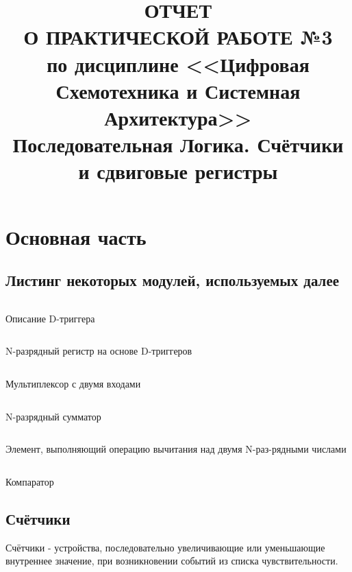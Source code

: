 \documentclass[a4paper]{article}
\title{
  ОТЧЕТ \\
  О ПРАКТИЧЕСКОЙ РАБОТЕ №3 \\
  по дисциплине <<Цифровая Схемотехника и Системная Архитектура>> \\
  Последовательная Логика. Счётчики и сдвиговые регистры
}
\begin{document}
  \templatedtitlepage
  
  \toc
  
  \section{Основная часть}

  \subsection{Листинг некоторых модулей, используемых далее}

  \begin{listing}[H]
    \inputminted{verilog}{../chapter_6/d_flip_flop.v}
    \caption{Описание D-триггера}
    \label{d_flip_flop_listing}
  \end{listing}

  \begin{listing}[H]
    \inputminted{verilog}{../chapter_6/register.v}
    \caption{N-разрядный регистр на основе D-триггеров}
    \label{register_listing}
  \end{listing}

  \begin{listing}[H]
    \inputminted{verilog}{../chapter_6/mux.v}
    \caption{Мультиплексор с двумя входами}
    \label{mux2_listing}
  \end{listing}

  \begin{listing}[H]
    \inputminted{verilog}{../chapter_6/adder.v}
    \caption{N-разрядный сумматор}
    \label{adder_listing}
  \end{listing}

  \begin{listing}[H]
    \inputminted{verilog}{../chapter_6/substractor.v}
    \caption{Элемент, выполняющий операцию вычитания над двумя N-раз-рядными числами}
    \label{substractor_listing}
  \end{listing}

  \begin{listing}[H]
    \inputminted{verilog}{../chapter_6/comparator.v}
    \caption{Компаратор}
    \label{comparator_listing}
  \end{listing}

  \subsection{Счётчики}

  Счётчики - устройства, последовательно увеличивающие или уменьшающие внутреннее
  значение, при возникновении событий из списка чувствительности.
\end{document}
